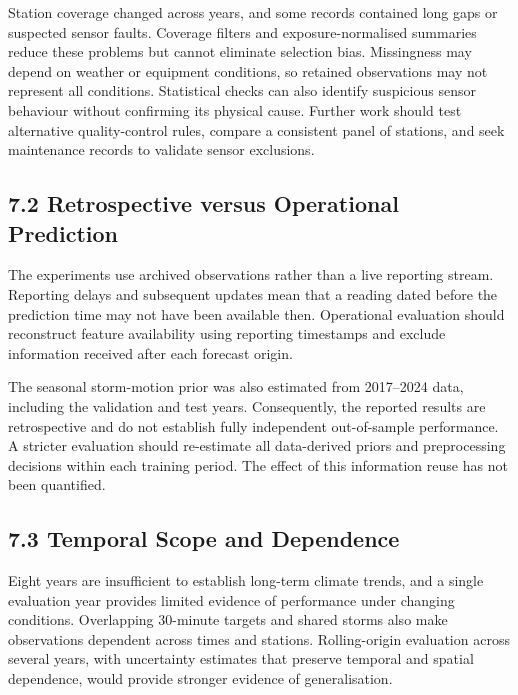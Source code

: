 \documentclass[11pt,a4paper]{article}
\begin{document}
Station coverage changed across years, and some records contained long gaps or suspected sensor faults. Coverage filters and exposure-normalised summaries reduce these problems but cannot eliminate selection bias. Missingness may depend on weather or equipment conditions, so retained observations may not represent all conditions. Statistical checks can also identify suspicious sensor behaviour without confirming its physical cause. Further work should test alternative quality-control rules, compare a consistent panel of stations, and seek maintenance records to validate sensor exclusions.


\subsection*{7.2 Retrospective versus Operational Prediction}
{}


The experiments use archived observations rather than a live reporting stream. Reporting delays and subsequent updates mean that a reading dated before the prediction time may not have been available then. Operational evaluation should reconstruct feature availability using reporting timestamps and exclude information received after each forecast origin.


The seasonal storm-motion prior was also estimated from 2017–2024 data, including the validation and test years. Consequently, the reported results are retrospective and do not establish fully independent out-of-sample performance. A stricter evaluation should re-estimate all data-derived priors and preprocessing decisions within each training period. The effect of this information reuse has not been quantified.


\subsection*{7.3 Temporal Scope and Dependence}
{}


Eight years are insufficient to establish long-term climate trends, and a single evaluation year provides limited evidence of performance under changing conditions. Overlapping 30-minute targets and shared storms also make observations dependent across times and stations. Rolling-origin evaluation across several years, with uncertainty estimates that preserve temporal and spatial dependence, would provide stronger evidence of generalisation.
\end{document}
